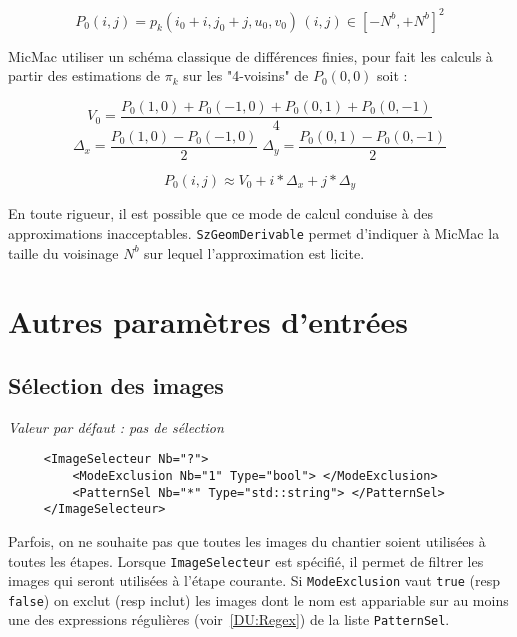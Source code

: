 \begin{equation}
    P_0(i,j) = p_k(i_0+i,j_0+j,u_0,v_0) \, (i,j) \in [-N^b,+N^b]^2
\end{equation}

MicMac utiliser un sch\'ema classique de diff\'erences finies, pour
fait les calculs \`a partir des estimations de $\pi_k$ sur les
"4-voisins" de $P_0(0,0)$ soit :

\begin{equation}
      V_0 = \frac{P_0(1,0)+P_0(-1,0)+P_0(0,1)+P_0(0,-1)}{4}
\end{equation}
\begin{equation}
      \Delta_x = \frac{P_0(1,0)-P_0(-1,0)}{2} \;
      \Delta_y = \frac{P_0(0,1)-P_0(0,-1)}{2}
\end{equation}

\begin{equation}
        P_0(i,j) \approx  V_0 + i *\Delta_x + j*\Delta_y
\end{equation}

En toute rigueur, il est possible que  ce mode de calcul conduise  \`a
des approximations  inacceptables. {\tt SzGeomDerivable} permet d'indiquer
\`a MicMac la taille du voisinage $N^b$ sur lequel l'approximation
est licite.



\section{Autres param\`etres d'entr\'ees}

\subsection{S\'election des images}

\emph{Valeur par d\'efaut : pas de s\'election}

\begin{verbatim}
     <ImageSelecteur Nb="?">
         <ModeExclusion Nb="1" Type="bool"> </ModeExclusion>
         <PatternSel Nb="*" Type="std::string"> </PatternSel>
     </ImageSelecteur>
\end{verbatim}

Parfois, on ne souhaite pas que toutes les images du chantier
soient utilis\'ees \`a toutes les \'etapes. Lorsque {\tt ImageSelecteur}
est sp\'ecifi\'e, il permet de filtrer les images qui seront
utilis\'ees \`a l'\'etape courante. Si {\tt  ModeExclusion}
vaut {\tt true} (resp {\tt false}) on exclut  (resp inclut)
les images dont le nom est appariable sur au moins une des
expressions r\'eguli\`eres (voir~\ref{DU:Regex})  de la liste  {\tt PatternSel}.


